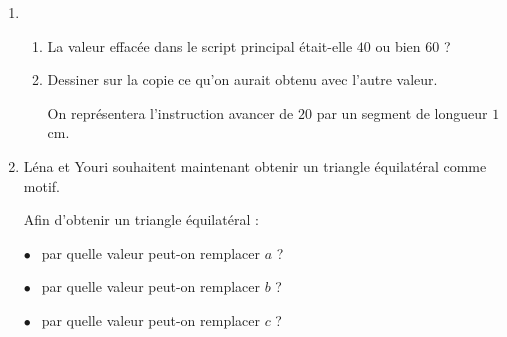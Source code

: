 \begin{enumerate}
\item 
	\begin{enumerate}
		\item La valeur effacée dans le script principal était-elle $40$ ou bien $60$ ?
		\item Dessiner sur la copie ce qu'on aurait obtenu avec l'autre valeur.
		
On représentera l'instruction \og avancer de $20$ \fg{} par un segment de longueur $1$ cm.
	\end{enumerate}
\item Léna et Youri souhaitent maintenant obtenir un triangle équilatéral comme motif.

\parbox{0.6\linewidth}{Afin d'obtenir un triangle équilatéral :

\medskip

$\bullet~~$ par quelle valeur peut-on remplacer $a$ ?

\medskip

$\bullet~~$ par quelle valeur peut-on remplacer $b$ ?

\medskip

$\bullet~~$ par quelle valeur peut-on remplacer $c$ ?}\hfill
\parbox{0.38\linewidth}{\begin{scratch}
{
}
\end{scratch}}
\end{enumerate}

\medskip

